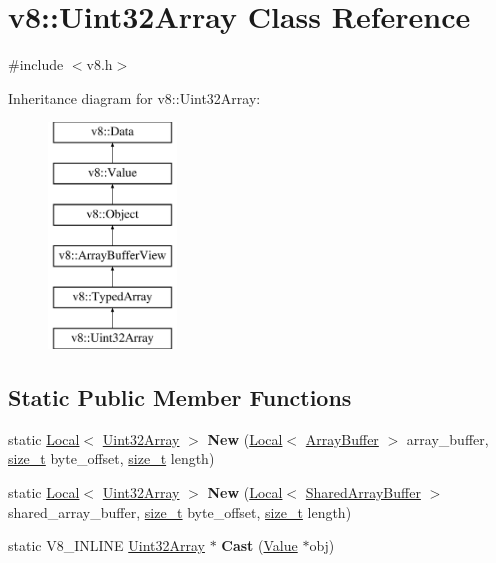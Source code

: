 \hypertarget{classv8_1_1Uint32Array}{}\section{v8\+:\+:Uint32\+Array Class Reference}
\label{classv8_1_1Uint32Array}


{\ttfamily \#include $<$v8.\+h$>$}

Inheritance diagram for v8\+:\+:Uint32\+Array\+:\begin{figure}[H]
\begin{center}
\leavevmode
\includegraphics[height=6.000000cm]{classv8_1_1Uint32Array}
\end{center}
\end{figure}
\subsection*{Static Public Member Functions}
\begin{DoxyCompactItemize}
\item 
\mbox{\label{classv8_1_1Uint32Array_ab8dbef5ff846fc6cc9381bc29f744b5b}} 
static \mbox{\hyperlink{classv8_1_1Local}{Local}}$<$ \mbox{\hyperlink{classv8_1_1Uint32Array}{Uint32\+Array}} $>$ {\bfseries New} (\mbox{\hyperlink{classv8_1_1Local}{Local}}$<$ \mbox{\hyperlink{classv8_1_1ArrayBuffer}{Array\+Buffer}} $>$ array\+\_\+buffer, \mbox{\hyperlink{classsize__t}{size\+\_\+t}} byte\+\_\+offset, \mbox{\hyperlink{classsize__t}{size\+\_\+t}} length)
\item 
\mbox{\label{classv8_1_1Uint32Array_a03da1a9371316818a926d2b8231ac33a}} 
static \mbox{\hyperlink{classv8_1_1Local}{Local}}$<$ \mbox{\hyperlink{classv8_1_1Uint32Array}{Uint32\+Array}} $>$ {\bfseries New} (\mbox{\hyperlink{classv8_1_1Local}{Local}}$<$ \mbox{\hyperlink{classv8_1_1SharedArrayBuffer}{Shared\+Array\+Buffer}} $>$ shared\+\_\+array\+\_\+buffer, \mbox{\hyperlink{classsize__t}{size\+\_\+t}} byte\+\_\+offset, \mbox{\hyperlink{classsize__t}{size\+\_\+t}} length)
\item 
\mbox{\label{classv8_1_1Uint32Array_ad40e645ee0abac443dba759ee861de49}} 
static V8\+\_\+\+I\+N\+L\+I\+NE \mbox{\hyperlink{classv8_1_1Uint32Array}{Uint32\+Array}} $\ast$ {\bfseries Cast} (\mbox{\hyperlink{classv8_1_1Value}{Value}} $\ast$obj)
\end{DoxyCompactItemize}
